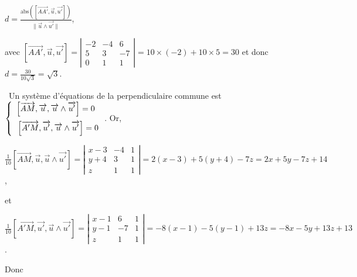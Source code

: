 \documentclass[11pt,a4paper]{article}
\begin{document}
\begin{center}
$d=\frac{\text{abs}\left(\left[\overrightarrow{AA'},\overrightarrow{u},\overrightarrow{u'}\right]\right)}{\|\overrightarrow{u}\wedge\overrightarrow{u'}\|}$,
\end{center}
avec $[\overrightarrow{AA'},\overrightarrow{u},\overrightarrow{u'}]=\left|
\begin{array}{ccc}
-2&-4&6\\
5&3&-7\\
0&1&1
\end{array}
\right|=10\times(-2)+10\times5=30$ et donc $d=\frac{30}{10\sqrt{3}}=\sqrt{3}$.

\begin{center}
\end{center}

\textbullet~Un système d'équations de la perpendiculaire commune est 
$\left\{
\begin{array}{l}
\left[\overrightarrow{AM},\overrightarrow{u},\overrightarrow{u}\wedge\overrightarrow{u'}\right]=0\\
\rule{0mm}{6mm}\left[\overrightarrow{A'M},\overrightarrow{u'},\overrightarrow{u}\wedge\overrightarrow{u'}\right]=0
\end{array}
\right.$. Or,

\begin{center}
$\frac{1}{10}\left[\overrightarrow{AM},\overrightarrow{u},\overrightarrow{u}\wedge\overrightarrow{u'}\right]=\left|
\begin{array}{ccc}
x-3&-4&1\\
y+4&3&1\\
z&1&1
\end{array}
\right|=2(x-3)+5(y+4)-7z=2x+5y-7z+14$,
\end{center}
et

\begin{center}
$\frac{1}{10}\left[\overrightarrow{A'M},\overrightarrow{u'},\overrightarrow{u}\wedge\overrightarrow{u'}\right]=\left|
\begin{array}{ccc}
x-1&6&1\\
y-1&-7&1\\
z&1&1
\end{array}
\right|=-8(x-1)-5(y-1)+13z=-8x-5y+13z+13$.
\end{center}
Donc
\end{document}
